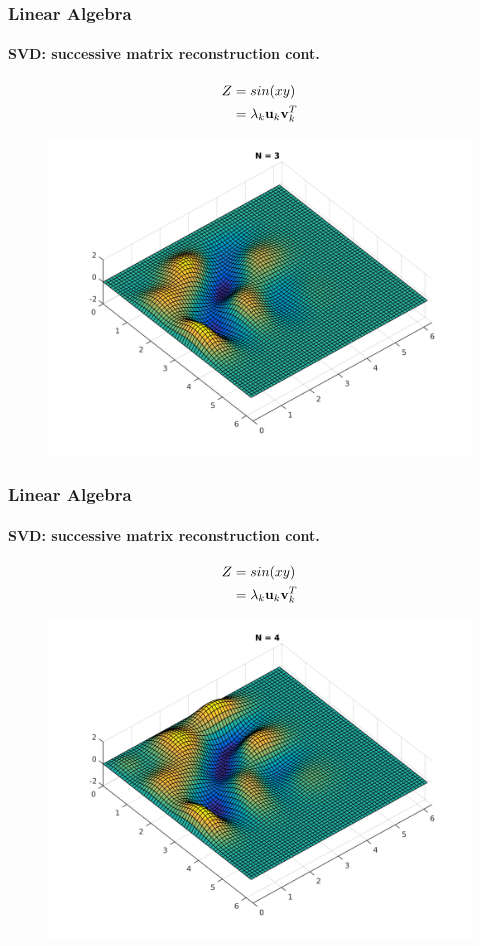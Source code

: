 \documentclass[hyperref={pdfpagelabels=true}]{beamer}
\begin{document}
\begin{frame}
\frametitle{Linear Algebra}
\framesubtitle{SVD: successive matrix reconstruction {\tiny cont.}}
\small{
\begin{center}
\begin{align*}
Z &= sin(xy) \\
  &= \lambda_k{\bf u}_k {\bf v}_k^T
\end{align*}
\end{center}}
\begin{figure}[!htb]
\centering
\includegraphics [scale=0.415]{as/a3.png}
\end{figure}
\end{frame}

\begin{frame}
\frametitle{Linear Algebra}
\framesubtitle{SVD: successive matrix reconstruction {\tiny cont.}} 
\small{
\begin{center}
\begin{align*}
Z &= sin(xy) \\
  &= \lambda_k{\bf u}_k {\bf v}_k^T
\end{align*}
\end{center}}
\begin{figure}[!htb]
\centering
\includegraphics [scale=0.415]{as/a4.png}
\end{figure}
\end{frame}
\end{document}
